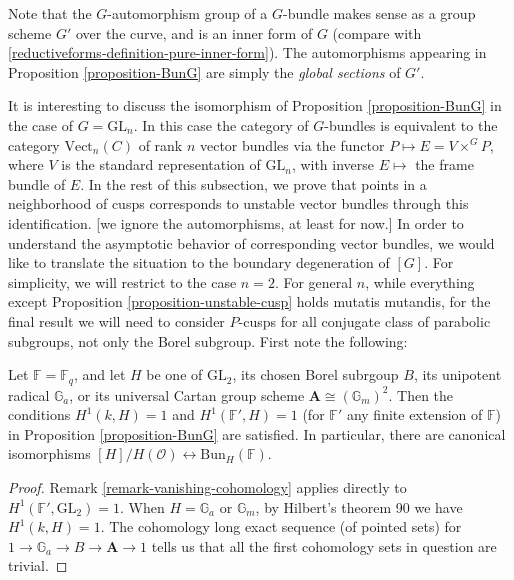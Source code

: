 \begin{remark}
 \label{remark-automorphism-group}
Note that the $G$-automorphism group of a $G$-bundle makes sense as a group scheme $G'$ over the curve, and is an inner form of $G$ (compare with \ref{reductiveforms-definition-pure-inner-form}). The automorphisms appearing in Proposition \ref{proposition-BunG} are simply the \emph{global sections} of $G'$.
\end{remark}

It is interesting to discuss the isomorphism of Proposition \ref{proposition-BunG} in the case of $G= \mathrm{GL}_n$. In this case the category of $G$-bundles is equivalent to the category $\mathrm{Vect}_n(C)$ of rank $n$ vector bundles via the functor $P\mapsto E = V\times^G P$, where $V$ is the standard representation of $\mathrm{GL}_n$, with inverse $E \mapsto$ the frame bundle of $E$. In the rest of this subsection, we prove that points in a neighborhood of cusps corresponds to unstable vector bundles through this identification. [we ignore the automorphisms, at least for now.]
In order to understand the asymptotic behavior of corresponding vector bundles, we would like to translate the situation to the boundary degeneration of $[G]$. For simplicity, we will restrict to the case $n=2$. For general $n$, while everything except Proposition \ref{proposition-unstable-cusp} holds mutatis mutandis, for the final result we will need to consider $P$-cusps for all conjugate class of parabolic subgroups, not only the Borel subgroup. First note the following:
\begin{lemma}
\label{lemma-vanishing-cohomology-borel-and-cartan}
Let $\mathbb F = \mathbb F_q$, and let $H$ be one of $\mathrm{GL}_2$, its chosen Borel subrgoup $B$, its unipotent radical $\mathbb G_a$, or its universal Cartan group scheme $\mathbf A\cong (\mathbb G_m)^2$. 
Then the conditions $H^1(k, H) = 1$ and $H^1(\mathbb F', H)=1$ (for $\mathbb F'$ any finite extension of $\mathbb F$) in Proposition \ref{proposition-BunG} are satisfied. 
In particular, there are canonical isomorphisms $[H]/H(\mathcal O)\leftrightarrow \mathrm{Bun}_H(\mathbb F)$.
\end{lemma}
\begin{proof}
Remark \ref{remark-vanishing-cohomology} applies directly to $H^1(\mathbb F', \mathrm{GL}_2)=1$. When $H=\mathbb G_a$ or $\mathbb G_m$, by Hilbert's theorem 90 we have $H^1(k, H)=1$. The cohomology long exact sequence (of pointed sets) for  $1\to \mathbb G_a\to B\to \mathbf A\to 1$ tells us that all the first cohomology sets in question are trivial.
\end{proof}

